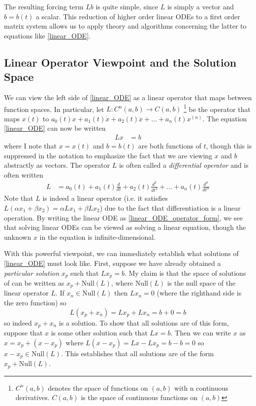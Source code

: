\documentclass[12pt]{article}
\begin{document}
The resulting forcing term $L b$ is quite simple, since $L$ is simply a vector and $b = b(t)$ a scalar. This reduction of higher order linear ODEs to a first order matrix system allows 
us to apply theory and algorithms concerning the latter to equations like \ref{linear_ODE}.

\subsection{Linear Operator Viewpoint and the Solution Space}
We can view the left side of \ref{linear_ODE} as a linear operator that maps between function spaces. In particular, let $L: C^n(a, b) \to C(a, b)$
\footnote{$C^n(a, b)$ denotes the space of functions on $(a, b)$ with n continuous derivatives. $C(a, b)$ is the space of continuous functions on $(a, b)$} be the operator 
that maps $x(t)$ to $a_0(t)x + a_1(t) \dot{x} + a_2(t) \ddot{x} + \dots + a_n(t) x^{(n)}$. The equation \ref{linear_ODE} can now be written 
\begin{align}
Lx &= b \label{linear_ODE_operator_form}
\end{align}
where I note that $x = x(t)$ and $b = b(t)$ are both functions of $t$, though this is suppressed in the notation to emphasize the fact that we are viewing $x$ and 
$b$ abstractly as vectors. The operator $L$ is often called a \textit{differential operator} and is often written 
\begin{align*}
L &= a_0(t) + a_1(t) \frac{d}{dt} + a_2(t) \frac{d^2}{dt^2} + \dots + a_n(t) \frac{d^n}{dt^n}
\end{align*}
Note that $L$ is indeed a linear operator (i.e. it satisfies $L(\alpha x_1 + \beta x_2) = \alpha L x_1 + \beta L x_2$) due to the fact that differentiation 
is a linear operation. By writing the linear ODE as \ref{linear_ODE_operator_form}, we see that solving linear ODEs can be viewed as solving a linear equation, though the unknown 
$x$ in the equation is infinite-dimensional. 

With this powerful viewpoint, we can immediately establish what solutions of \ref{linear_ODE} must look like. First, suppose we have already obtained a \textit{particular solution}
$x_p$ such that $L x_p = b$. My claim is that the space of solutions of \label{linear_ODE} can be written as $x_p + \text{Null}(L)$, where $\text{Null}(L)$ 
is the null space of the linear operator $L$. If $x_n \in \text{Null}(L)$ then $L x_n = 0$ (where the righthand side is the zero function) so 
\[L(x_p + x_n) = L x_p + L x_n = b + 0 = b\]
so indeed $x_p + x_n$ is a solution. To show that all solutions are of this form, suppose that $x$ is some other solution such that $Lx = b$. Then we can write $x$ as 
$x = x_p + (x - x_p)$ where $L(x - x_p) = Lx - L x_p = b - b = 0$ so $x - x_p \in \text{Null}(L)$. This establishes that all solutions are of the form $x_p + \text{Null}(L)$. 
\end{document}
